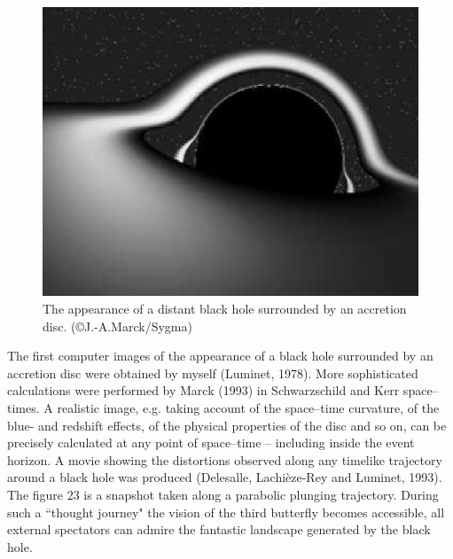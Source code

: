 \documentclass[12pt]{article}
\begin{document}
\begin{figure}[ht]
  \begin{center}
    \leavevmode
    \includegraphics{TNM.ps}
    \caption{
The appearance of a distant black hole surrounded by an accretion disc.
(\copyright J.-A.Marck/Sygma)}
  \end{center}
\end{figure}
The first computer images of the appearance of a black hole surrounded 
by an accretion disc were obtained by myself (Luminet, 1978). More 
sophisticated calculations were performed by Marck (1993) in 
Schwarzschild and Kerr space--times. A realistic image, e.g. taking account 
of the space--time curvature, of the blue- and redshift effects, of the physical properties
of the disc and so on, can be precisely calculated 
at any point of space--time -- including inside the event horizon. A movie
showing the distortions observed along any 
timelike trajectory around a black hole was produced (Delesalle, 
Lachi\`eze-Rey and Luminet, 1993). The figure 23 is a snapshot taken along a parabolic 
plunging trajectory. During such a ``thought 
journey" the vision of the third butterfly becomes accessible, all external spectators 
can admire the fantastic landscape generated by the black hole. 
\end{document}

